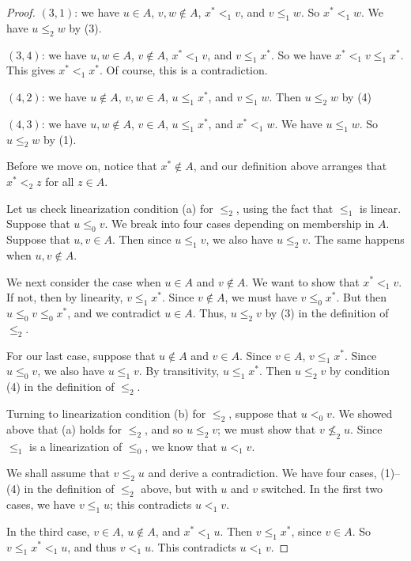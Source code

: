 \documentclass[letterpaper]{article}
\theoremstyle{definition}
\begin{document}
\begin{proof}
$(3,1)$: we have $u\in A$, $v,w\notin A$, $x^*<_1 v$, and $v \leq_1 w$.
So $x^* <_1 w$.   We have $u \leq_2 w$ by (3).


$(3,4)$: we have $u, w\in A$, $v\notin A$, $x^* <_1 v$, and $v\leq_1 x^*$.
So we have $x^* <_1 v \leq_1 x^*$.  This gives $x^* <_1 x^*$.  Of course, this is a contradiction.

 

$(4,2)$: we have $u\notin A$, $v,w\in A$, $u\leq_1 x^*$, and $v \leq_1 w$.   
Then $u \leq_2 w$ by (4)

$(4,3)$: we have  $u,w\notin A$, $v\in A$, $u\leq_1 x^*$, and $x^* <_1 w$.
We have $u \leq_1 w$.   So  $u \leq_2 w$ by (1).
 
 \medskip


Before we move on,
notice that  $x^*\notin A$, and our definition above arranges that
$x^* <_2 z$ for all $z\in A$. 

 \medskip
 
Let us check linearization condition  (a) for   $\leq_2$, using the fact that $\leq_1$ is linear.
  Suppose that  $u\leq_0 v$.
We break into four cases depending on membership in $A$.
Suppose that $u, v\in A$.  Then since $u\leq_1 v$, we also have $u \leq_2 v$.
The same happens when $u, v\notin A$.

We next consider the case when $u\in A$ and $v\notin A$.
We want to show that $x^* <_1 v$.  If not, then by linearity, $v\leq_1 x^*$.
Since $v\notin A$, we must have $v \leq_0 x^*$.  But then $u \leq_0 v \leq_0 x^*$,
and we contradict $u\in A$.  Thus, $u\leq_2 v$ by (3) in the definition of $\leq_2$.

For our last case, suppose that $u\notin A$ and $v\in A$.
Since $v\in A$, $v\leq_1 x^*$.  Since $u\leq_0 v$, we also have 
$u\leq_1 v$.  By transitivity, $u\leq_1 x^*$.
Then $u \leq_2 v$ by condition (4) in the  definition of 
$\leq_2$.
 
 \medskip
 

Turning to linearization condition (b) for $\leq_2$, suppose that $u <_0 v$.
We showed above that (a) holds for $\leq_2$, and so $u \leq_2 v$; we must show that $v \nleq_2 u$.
Since $\leq_1$ is a linearization of $\leq_0$, we know that $u <_1 v$.

We shall assume that $v \leq_2 u$ and derive a contradiction.
We have four cases, (1)--(4) in the definition of $\leq_2$ above, but with $u$ and $v$ switched.  
In the first two cases, we have $v \leq_1 u$; this contradicts  $u <_1 v$.
 
In the third case, $v\in A$, $u\notin A$, and $x^* <_1 u$.
Then $v\leq_1 x^*$, since $v\in A$.
So $v\leq_1 x^* <_1 u$, and thus $v <_1 u$.  
This contradicts  $u <_1 v$.


\end{proof}
\end{document}

